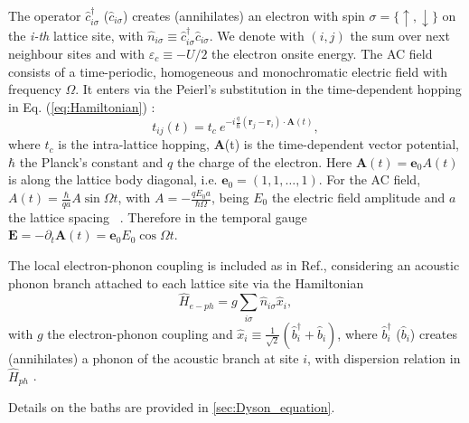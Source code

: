 \documentclass[aps,prb,groupedaddress,showpacs,twocolumn,superscriptaddress,10pt]{revtex4-2}
\renewcommand{\vec}[1]{\bm{#1}} %
\begin{document}
The operator $\hat{c}^{\dagger}_{i\sigma}$ ($\hat{c}_{i\sigma}$) creates (annihilates) an electron with spin $\sigma= \lbrace \uparrow,\downarrow \rbrace$ on the \emph{i-th} lattice site, with $\hat{n}_{i\sigma}\equiv \hat{c}^{\dagger}_{i\sigma} \hat{c}_{i\sigma}$. We denote with $(i,j)$ the sum over next neighbour sites and with $\varepsilon_c \equiv -U/2$ the electron onsite energy. The AC field consists of a time-periodic, homogeneous and monochromatic electric field with frequency $\Omega$. It enters via the Peierl's substitution in the time-dependent hopping in Eq. (\ref{eq:Hamiltonian}) \cite{peie.33}:
\begin{equation}\label{eq:peierls} 
t_{ij}(t) = t_{c} \ e^{-i \frac{q}{\hbar} \left( \vec{r}_j - \vec{r}_i \right) \cdot \vec{A}(t)}, 
\end{equation} 
where $t_{c}$ is the intra-lattice hopping, $\vec{A}$(t) is the time-dependent vector potential, $\hbar$ the Planck's constant and $q$ the charge of the electron. Here $\vec{A}(t)=\vec{e}_{0} A(t)$ is along the lattice body diagonal, i.e. $\vec{e}_{0}=(1,1,\dots,1)$. For the AC field, $A(t)=\frac{\hbar}{qa}A\sin\Omega t$, with $A=-\frac{qE_0a}{\hbar\Omega}$, being $E_0$ the electric field amplitude and $a$ the lattice spacing ~\cite{ts.ok.08}. Therefore in the temporal gauge $\vec{E}= -\partial_{t}\vec{A}(t) = \vec{e}_{0}E_0 \cos\Omega t$.
  
The local electron-phonon coupling is included as in Ref.\cite{ma.ga.22u}, considering an acoustic phonon branch attached to each lattice site via the Hamiltonian 
\begin{equation}\label{eq:e-ph_ham} 
\hat{H}_{e-ph} = g \sum_{i\sigma} \hat{n}_{i\sigma} \hat{x}_{i},  
\end{equation}
with $g$ the electron-phonon coupling and $\hat{x}_{i} \equiv \frac{1}{\sqrt{2}} \left( \hat{b}^{\dagger}_{i} + \hat{b}_i \right)$, where $\hat{b}^{\dagger}_{i}$ ($\hat{b}_{i}$) creates (annihilates) a phonon of the acoustic branch at site $i$, with dispersion relation in $\hat{H}_{ph}$ \cite{ma.ga.22u}.  
 
Details on the baths are provided in \ref{sec:Dyson_equation}. 
 
\end{document}
